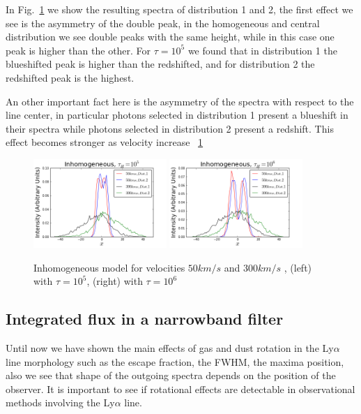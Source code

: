 \documentclass[usenatbib]{mn2e}
\begin{document}
In Fig.~\ref{figure:inhomogeneous} we show the resulting spectra of 
distribution 1 and 2, the first effect we see is the asymmetry of the
double peak, in the homogeneous and central distribution we see double
peaks with the same height, while in this case one peak is higher than 
the other. For $\tau=10^{5}$ we found that in distribution 1 the blueshifted
peak is higher than the redshifted, and for distribution 2 the redshifted
peak is the highest.

An other important fact here is the asymmetry of the spectra with respect 
to the line center, in particular photons selected in distribution 1 
present a blueshift in their spectra while photons selected in distribution 
2 present a redshift. This effect becomes stronger as velocity increase 
~\ref{figure:inhomogeneous}
 
\begin{figure}
  \includegraphics[width=0.45\textwidth]{InomogeneousModelt5.png}
  \includegraphics[width=0.45\textwidth]{InomogeneousModelt6.png}
 \caption{Inhomogeneous model for velocities $50km/s$ and $300km/s$ , (left) with $\tau=10^5$, (right) with $\tau=10^6$\label{figure:inhomogeneous}} 
\end{figure}
 

\subsection{Integrated flux in a narrowband filter}

Until now we have shown the main effects of gas and dust rotation in the Ly$\alpha$ line morphology such as the escape fraction, the FWHM, the maxima position, also we see that shape of the outgoing spectra depends on the position of the observer. It is important to see if rotational effects are detectable in observational methods involving the Ly$\alpha$ line. 
\end{document}
